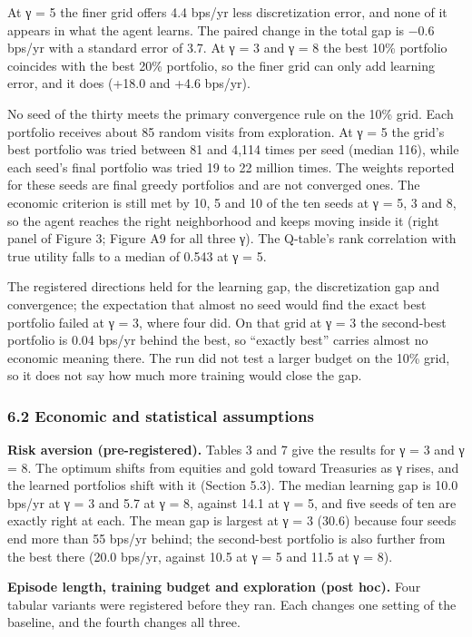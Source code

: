 \documentclass[
  11pt]{article}
\begin{document}
At γ = 5 the finer grid offers 4.4 bps/yr less discretization error, and
none of it appears in what the agent learns. The paired change in the
total gap is −0.6 bps/yr with a standard error of 3.7. At γ = 3 and γ =
8 the best 10\% portfolio coincides with the best 20\% portfolio, so the
finer grid can only add learning error, and it does (+18.0 and +4.6
bps/yr).

No seed of the thirty meets the primary convergence rule on the 10\%
grid. Each portfolio receives about 85 random visits from exploration.
At γ = 5 the grid's best portfolio was tried between 81 and 4,114 times
per seed (median 116), while each seed's final portfolio was tried 19 to
22 million times. The weights reported for these seeds are final greedy
portfolios and are not converged ones. The economic criterion is still
met by 10, 5 and 10 of the ten seeds at γ = 5, 3 and 8, so the agent
reaches the right neighborhood and keeps moving inside it (right panel
of Figure 3; Figure A9 for all three γ). The Q-table's rank correlation
with true utility falls to a median of 0.543 at γ = 5.

The registered directions held for the learning gap, the discretization
gap and convergence; the expectation that almost no seed would find the
exact best portfolio failed at γ = 3, where four did. On that grid at γ
= 3 the second-best portfolio is 0.04 bps/yr behind the best, so
``exactly best'' carries almost no economic meaning there. The run did
not test a larger budget on the 10\% grid, so it does not say how much
more training would close the gap.

\subsubsection{6.2 Economic and statistical
assumptions}\label{economic-and-statistical-assumptions}

\textbf{Risk aversion (pre-registered).} Tables 3 and 7 give the results
for γ = 3 and γ = 8. The optimum shifts from equities and gold toward
Treasuries as γ rises, and the learned portfolios shift with it (Section
5.3). The median learning gap is 10.0 bps/yr at γ = 3 and 5.7 at γ = 8,
against 14.1 at γ = 5, and five seeds of ten are exactly right at each.
The mean gap is largest at γ = 3 (30.6) because four seeds end more than
55 bps/yr behind; the second-best portfolio is also further from the
best there (20.0 bps/yr, against 10.5 at γ = 5 and 11.5 at γ = 8).

\textbf{Episode length, training budget and exploration (post hoc).}
Four tabular variants were registered before they ran. Each changes one
setting of the baseline, and the fourth changes all three.
\end{document}

